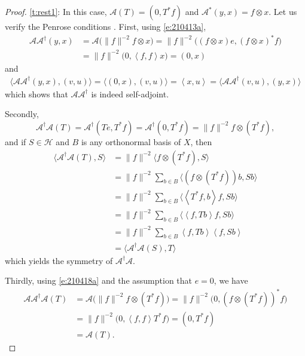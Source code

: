 \documentclass[12pt]{article}
\newcommand{\scal}[2]{\left\langle{#1},{#2}  \right\rangle}
\newcommand{\bscal}[2]{\big\langle{#1},{#2}\big\rangle}
\theoremstyle{definition}
\providecommand{\mH}{\mathcal{H}}
\begin{document}
{\begin{proof}
\cref{t:rest1}:
In this case, 
$\mathcal{A}(T) = (0,T^*f)$ 
and $\mathcal{A}^*(y,x) = f\otimes x$. 
Let us verify the Penrose conditions \cite[page~48]{Groetsch}.
First, using \cref{e:210413a}, 
\begin{subequations}
\label{e:210418b}
\begin{align}
\mathcal{A}\mathcal{A}^\dagger(y,x)
&= \mathcal{A}\big(\|f\|^{-2}f\otimes x\big)
= \|f\|^{-2}\big((f\otimes x)e,(f\otimes x)^*f\big)\\
&= \|f\|^{-2}\big(0,\scal{f}{f}x\big)
= (0,x)
\end{align}
\end{subequations}
and 
\begin{align}
\bscal{\mathcal{A}\mathcal{A}^\dagger(y,x)}{(v,u)}
= \bscal{(0,x)}{(v,u)} = \scal{x}{u}
= \bscal{\mathcal{A}\mathcal{A}^\dagger(v,u)}{(y,x)}
\end{align}
which shows that $\mathcal{A}\mathcal{A}^\dagger$ is 
indeed { self-adjoint}.

Secondly, 
\begin{equation}
\label{e:210418a}
\mathcal{A}^\dagger\mathcal{A}(T)
= \mathcal{A}^\dagger(Te,T^*f)
= \mathcal{A}^\dagger(0,T^*f)
= \|f\|^{-2}f\otimes(T^*f), 
\end{equation}
and if 
$S\in\mH$ and 
$B$ is any orthonormal basis of $X$, 
then 
\begin{subequations}
\begin{align}
\bscal{\mathcal{A}^\dagger\mathcal{A}(T)}{S}
&= \|f\|^{-2}\bscal{f\otimes (T^*f)}{S}\\
&= \|f\|^{-2}\sum_{b\in B}\bscal{(f\otimes(T^*f))b}{Sb}\\
&= \|f\|^{-2}\sum_{b\in B}\bscal{\scal{T^*f}{b}f}{Sb}\\
&= \|f\|^{-2}\sum_{b\in B}\bscal{\scal{f}{Tb}f}{Sb}\\
&= \|f\|^{-2}\sum_{b\in B}\scal{f}{Tb}\scal{f}{Sb}\\
&= \bscal{\mathcal{A}^\dagger\mathcal{A}(S)}{T}
\end{align}
\end{subequations}
which yields the symmetry of $\mathcal{A}^\dagger\mathcal{A}$. 

Thirdly, using \cref{e:210418a} 
and the assumption that $e=0$, we have 
\begin{subequations}
\begin{align}
\mathcal{A}\mathcal{A}^\dagger\mathcal{A}(T)
&=
\mathcal{A}\big( \|f\|^{-2}f\otimes(T^*f)\big)
=\|f\|^{-2}\big(0,(f\otimes(T^*f))^*f \big)\\
&=\|f\|^{-2}\big(0,\scal{f}{f}T^*f\big)
= (0,T^*f)\\
&=\mathcal{A}(T).
\end{align}
\end{subequations}


\end{proof}}
\end{document}
